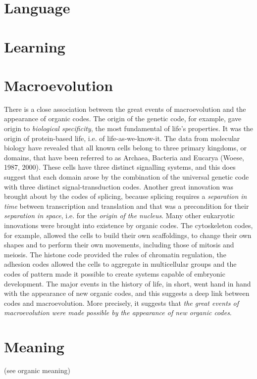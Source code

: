 \documentclass[12pt]{article}
\begin{document}
\hypertarget{language}{}
\section{Language}

\hypertarget{learning}{}
\section{Learning}

\section{Macroevolution} 
There is a close association between the great events of macroevolution and the appearance of organic codes. The origin of the genetic code, for example, gave origin to \textit{biological specificity}, the most fundamental of life's properties. It was the origin of protein-based life, i.e. of life-as-we-know-it. The data from molecular biology have revealed that all known cells belong to three primary kingdoms, or domains, that have been referred to as Archaea, Bacteria and Eucarya (Woese, 1987, 2000). These cells have three distinct signalling systems, and this does suggest that each domain arose by the combination of the universal genetic code with three distinct signal-transduction codes. Another great innovation was brought about by the codes of splicing, because splicing requires a \textit{separation in time} between transcription and translation and that was a precondition for their \textit{separation in space}, i.e. for the \textit{origin of the nucleus}. Many other eukaryotic innovations were brought into existence by organic codes. The cytoskeleton codes, for example, allowed the cells to build their own scaffoldings, to change their own shapes and to perform their own movements, including those of mitosis and meiosis. The histone code provided the rules of chromatin regulation, the adhesion codes allowed the cells to aggregate in multicellular groups and the codes of pattern made it possible to create systems capable of embryonic development. The major events in the history of life, in short, went hand in hand with the appearance of new organic codes, and this suggests a deep link between codes and macroevolution. More precisely, it suggests that \textit{the great events of macroevolution were made possible by the appearance of new organic codes}. 


\section{Meaning} (see organic meaning)
\end{document}
